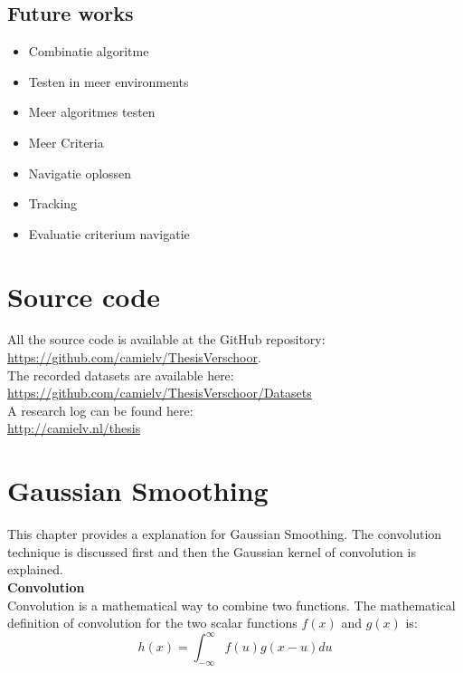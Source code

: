\documentclass[a4paper]{article}
\begin{document}
\subsection{Future works}
\begin{itemize}
\item Combinatie algoritme
\item Testen in meer environments
\item Meer algoritmes testen
\item Meer Criteria
\item Navigatie oplossen
\item Tracking
\item Evaluatie criterium navigatie
\end{itemize}
\newpage
\begin{appendices}
\section{Source code}
All the source code is available at the GitHub repository:\\ \url{https://github.com/camielv/ThesisVerschoor}.\\
The recorded datasets are available here:\\
\url{https://github.com/camielv/ThesisVerschoor/Datasets}\\
A research log can be found here:\\
\url{http://camielv.nl/thesis}

\newpage
\section{Gaussian Smoothing}
\label{gaussiansmoothing}
This chapter provides a explanation for Gaussian Smoothing. The convolution technique is discussed first and then the Gaussian kernel of convolution is explained.\\

\noindent\textbf{Convolution}\\
Convolution is a mathematical way to combine two functions. The mathematical definition of convolution for the two scalar functions $f(x)$ and $g(x)$ is:
\begin{equation*}
h(x) = \int_{-\infty}^\infty f(u)g(x - u)du
\end{equation*}


\end{appendices}
\end{document}
